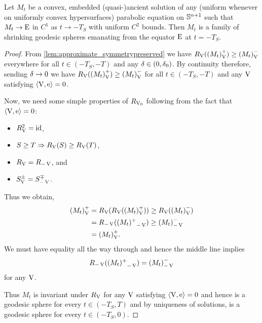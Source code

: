 \documentclass{amsart}
\begin{document}
\begin{theorem}
\label{thm:classification}
Let \(M_t\) be a convex, embedded (quasi-)ancient solution of any (uniform whenever on uniformly convex hypersurfaces) parabolic equation on \(\S^{n+1}\) such that \(M_t \to \equator\) in \(C^1\) as \(t \to -T_S\) with uniform \(C^2\) bounds. Then \(M_t\) is a family of shrinking geodesic spheres emanating from the equator \(\equator\) at \(t=-T_S\).
\end{theorem}

\begin{proof}
From \cref{lem:approximate_symmetrypreserved} we have \(\reflectionmap(\reflectionset{(M_t)}^+) \geq \reflectionset{(M_t)}^-\) everywhere for all \(t \in (-T_S, -T)\) and any \(\reflectionangle \in (0,\reflectionangle_0)\). By continuity therefore, sending \(\reflectionangle \to 0\) we have \(\reflectionmap(\reflectionset{(M_t)}^+) \geq \reflectionset{(M_t)}^-\) for all \(t \in (-T_S, -T)\)  and any \(\reflectionvector\) satisfying \(\ip{\reflectionvector}{\vertvec} = 0\).

Now, we need some simple properties of $\reflectionmap[\reflectionvector_0]$ following from the fact that $\ip{\reflectionvector}{\vertvec} = 0$:
\begin{itemize}
\item $\reflectionmap^2 = \id$,
\item $S \geq T \Rightarrow \reflectionmap(S) \geq  \reflectionmap(T)$,
\item $\reflectionmap = \reflectionmap[-\reflectionvector]$, and
\item $\reflectionset{S}^{\pm} = \reflectionset[-\reflectionvector]{S}^{\mp}$.
\end{itemize}
Thus we obtain,
\begin{align*}
\reflectionset{(M_t)}^+ &= \reflectionmap(\reflectionmap(\reflectionset{(M_t)}^+)) \geq \reflectionmap(\reflectionset{(M_t)}^-) \\
&= \reflectionmap[-\reflectionvector](\reflectionset[-\reflectionvector]{(M_t)^+}) \geq \reflectionset[-\reflectionvector]{(M_t)}^-\\
&= \reflectionset{(M_t)}^+.
\end{align*}
We must have equality all the way through and hence the middle line implies
\[
\reflectionmap[-\reflectionvector](\reflectionset[-\reflectionvector]{(M_t)^+}) = \reflectionset[-\reflectionvector]{(M_t)}^-
\]
for any $\reflectionvector$.

Thus \(M_t\) is invariant under \(\reflectionmap\) for any \(\reflectionvector\) satisfying \(\ip{\reflectionvector}{\vertvec} = 0\) and hence is a geodesic sphere for every \(t \in (-T_S, T)\) and by uniqueness of solutions, is a geodesic sphere for every \(t \in (-T_S, 0)\).
\end{proof}



\end{document}
